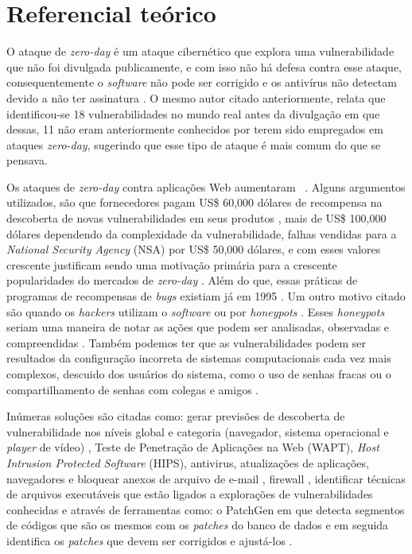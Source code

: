 \section{Referencial teórico}
O ataque de \textit{zero-day} é um ataque cibernético que explora uma vulnerabilidade que não foi divulgada publicamente, e com isso não 
há defesa contra esse ataque, consequentemente o \textit{software} não pode ser corrigido e os antivírus não detectam devido a não 
ter assinatura \cite{Bilge:2012}. O mesmo autor citado anteriormente, relata que identificou-se 18 vulnerabilidades no mundo real antes 
da divulgação em que dessas, 11 não eram anteriormente conhecidos por terem sido empregados em ataques \textit{zero-day}, sugerindo que 
esse tipo de ataque é mais comum do que se pensava. 

Os ataques de \textit{zero-day} contra aplicações Web aumentaram ~\cite{Kumar:2016}. Alguns argumentos utilizados, são que fornecedores 
pagam US\$ 60,000 dólares de recompensa na descoberta de novas vulnerabilidades em seus produtos \cite{Egelman:2013}, mais de US\$ 
100,000 dólares dependendo da complexidade da vulnerabilidade\cite{Bilge:2012}, falhas vendidas para a \textit{National Security Agency} 
(NSA) por US\$ 50,000 dólares, e com esses valores crescente justificam sendo uma motivação primária para a crescente popularidades do 
mercados de \textit{zero-day} \cite{Egelman:2013}. Além do que, essas práticas de programas de recompensas de \textit{bugs} existiam já 
em 1995 \cite{Egelman:2013}. Um outro motivo citado são quando os \textit{hackers} utilizam o \textit{software} ou por \textit{honeypots} 
\cite{Fotiet:2015}. Esses \textit{honeypots} seriam uma maneira de notar as ações que podem ser analisadas, observadas e compreendidas
\cite{Spitzner:2003}. Também podemos ter que as vulnerabilidades podem ser resultados da configuração incorreta de sistemas 
computacionais cada vez mais complexos, descuido dos usuários do sistema, como o uso de senhas fracas ou o compartilhamento de senhas com 
colegas e amigos \cite{Fotiet:2015}.

Inúmeras soluções são citadas como: gerar previsões de descoberta de vulnerabilidade nos níveis global e categoria 
(navegador, sistema operacional e \textit{player} de vídeo) \cite{Last:2016}, Teste de Penetração de Aplicações na Web (WAPT), 
\textit{Host Intrusion Protected Software} (HIPS), antivirus, atualizações de aplicações, navegadores e bloquear anexos de arquivo
de e-mail \cite{Kumar:2016}, firewall \cite{Last:2016}, identificar técnicas de arquivos executáveis que estão ligados a explorações de 
vulnerabilidades conhecidas \cite{Bilge:2012} e através de ferramentas como: o PatchGen em que detecta segmentos de códigos que são os 
mesmos com os \textit{patches} do banco de dados e em seguida identifica os \textit{patches} que devem ser corrigidos e ajustá-los 
\cite{Luo:2015}.
